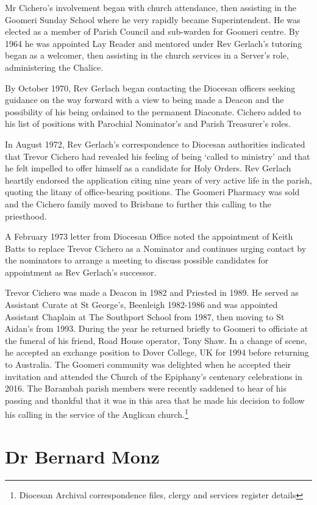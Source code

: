 Mr Cichero's involvement began with church attendance, then assisting in the Goomeri Sunday School where he very rapidly became Superintendent. He was elected as a member of Parish Council and sub-warden for Goomeri centre. By 1964 he was appointed Lay Reader and mentored under Rev Gerlach's tutoring began as a welcomer, then assisting in the church services in a Server's role, administering the Chalice.

By October 1970, Rev Gerlach began contacting the Diocesan officers seeking guidance on the way forward with a view to being made a Deacon and the possibility of his being ordained to the permanent Diaconate. Cichero added to his list of positions with Parochial Nominator's and Parish Treasurer's roles.

In August 1972, Rev Gerlach's correspondence to Diocesan authorities indicated that Trevor Cichero had revealed his feeling of being `called to ministry' and that he felt impelled to offer himself as a candidate for Holy Orders. Rev Gerlach heartily endorsed the application citing nine years of very active life in the parish, quoting the litany of office-bearing positions. The Goomeri Pharmacy was sold and the Cichero family moved to Brisbane to further this calling to the priesthood.

A February 1973 letter from Diocesan Office noted the appointment of Keith Batts to replace Trevor Cichero as a Nominator and continues urging contact by the nominators to arrange a meeting to discuss possible candidates for appointment as Rev Gerlach's successor.

Trevor Cichero was made a Deacon in 1982 and Priested in 1989. He served as Assistant Curate at St George's, Beenleigh 1982-1986 and was appointed Assistant Chaplain at The Southport School from 1987, then moving to St Aidan's from 1993. During the year he returned briefly to Goomeri to officiate at the funeral of his friend, Road House operator, Tony Shaw. In a change of scene, he accepted an exchange position to Dover College, UK for 1994 before returning to Australia. The Goomeri community was delighted when he accepted their invitation and attended the Church of the Epiphany's centenary celebrations in 2016. The Barambah parish members were recently saddened to hear of his passing and thankful that it was in this area that he made his decision to follow his calling in the service of the Anglican church.\footnote{Diocesan Archival correspondence files, clergy and services register details}

\hypertarget{dr-bernard-monz}{%
\section{Dr Bernard Monz}\label{dr-bernard-monz}}

